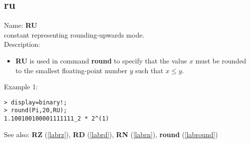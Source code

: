 \subsection{ru}
\label{labru}
\noindent Name: \textbf{RU}\\
constant representing rounding-upwards mode.\\

\noindent Description: \begin{itemize}

\item \textbf{RU} is used in command \textbf{round} to specify that the value $x$ must be rounded
   to the smallest floating-point number $y$ such that $x \le y$.
\end{itemize}
\noindent Example 1: 
\begin{center}\begin{minipage}{15cm}\begin{Verbatim}[frame=single]
> display=binary!;
> round(Pi,20,RU);
1.100100100001111111_2 * 2^(1)
\end{Verbatim}
\end{minipage}\end{center}
See also: \textbf{RZ} (\ref{labrz}), \textbf{RD} (\ref{labrd}), \textbf{RN} (\ref{labrn}), \textbf{round} (\ref{labround})
